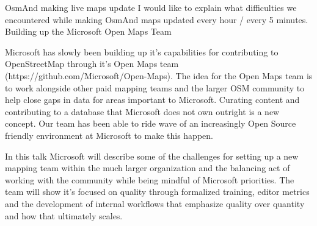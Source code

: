 %
{OsmAnd making live maps update}%
{}%
{%
  I would like to explain what difficulties we encountered while making OsmAnd maps updated every hour / every 5 minutes.%
}
%
{Building up the Microsoft Open Maps Team}%
{}%
{%
  Microsoft has slowly been building up it's capabilities for contributing to OpenStreetMap through it's Open Maps team
(https://github.com/Microsoft/Open-Maps). The idea for the Open Maps team is to work alongside other paid mapping teams and the larger OSM community to help close gaps in data for areas important to Microsoft. Curating content and contributing to a database that Microsoft does not own outright is a new concept.  Our team has been able to ride wave of an increasingly Open Source friendly environment at Microsoft to make this happen.

In this talk Microsoft will describe some of the challenges for setting up a new mapping team within the much larger organization and the balancing act of working with the community while being mindful of Microsoft priorities. The team will show it's focused on quality through formalized training, editor metrics and the development of internal workflows that emphasize quality over quantity and how that ultimately scales.
%
}


